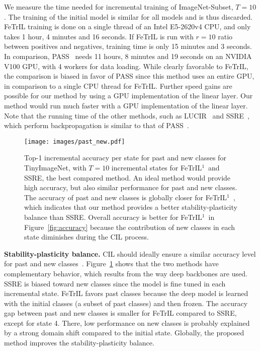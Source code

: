 \documentclass[10pt,twocolumn,letterpaper]{article}
\makeatletter
\newcommand{\ourmodel}{FeTrIL\@\xspace}
\newcommand{\ourmodelNospace}{FeTrIL}
\newcommand{\ourmodelone}{FeTrIL$^1$~}
\makeatother
\begin{document}
We measure the time needed for incremental training of ImageNet-Subset, $T=10$.
The training of the initial model is similar for all models and is thus discarded.
\ourmodel training is done on a single thread of an Intel E5-2620v4 CPU, and only takes 1 hour, 4 minutes and 16 seconds. 
If \ourmodel is run with $r=10$ ratio between positives and negatives, training time is only 15 minutes and 3 seconds. 
In comparison, PASS~\cite{zhu2021pass} needs 11 hours, 8 minutes and 19 seconds on an NVIDIA V100 GPU, with 4 workers for data loading.
While clearly favorable to \ourmodelNospace, the comparison is biased in favor of PASS since this method uses an entire GPU, in comparison to a single CPU thread for \ourmodel. 
Further speed gains are possible for our method by using a GPU implementation of the linear layer.
Our method would run much faster with a GPU implementation of the linear layer. 
Note that the running time of the other methods, such as LUCIR~\cite{hou2019_lucir} and SSRE~\cite{zhu2022self},  which perform backpropagation is similar to that of PASS~\cite{zhu2021pass}. 

\begin{figure}
\centering
    \texttt{[image: images/past\_new.pdf]}\\
\caption{Top-1 incremental accuracy per state for past and new classes for TinyImageNet, with $T=10$ incremental states for \ourmodelone and SSRE, the best compared method. An ideal method would provide high accuracy, but also similar performance for past and new classes. The accuracy of past and new classes is globally closer for \ourmodelone, which indicates that our method provides a better stability-plasticity balance than SSRE. Overall accuracy is better for \ourmodelone in Figure~\ref{fig:accuracy} because the contribution of new classes in each state diminishes during the CIL process.
}
\vspace{-4mm}
\label{fig:balance}
\end{figure}

\textbf{Stability-plasticity balance.}
CIL should ideally ensure a similar accuracy level for past and new classes~\cite{masana2021_study,zhu2022self}.
Figure~\ref{fig:balance} shows that the two methods have complementary behavior, which results from the way deep backbones are used.
SSRE is biased toward new classes since the model is fine tuned in each incremental state.
\ourmodel favors past classes because the deep model is learned with the initial classes (a subset of past classes) and then frozen.
The accuracy gap between past and new classes is smaller for \ourmodel compared to SSRE, except for state 4.
There, low performance on new classes is probably explained by a strong domain shift compared to the initial state. 
Globally, the proposed method improves the stability-plasticity balance.
\end{document}
